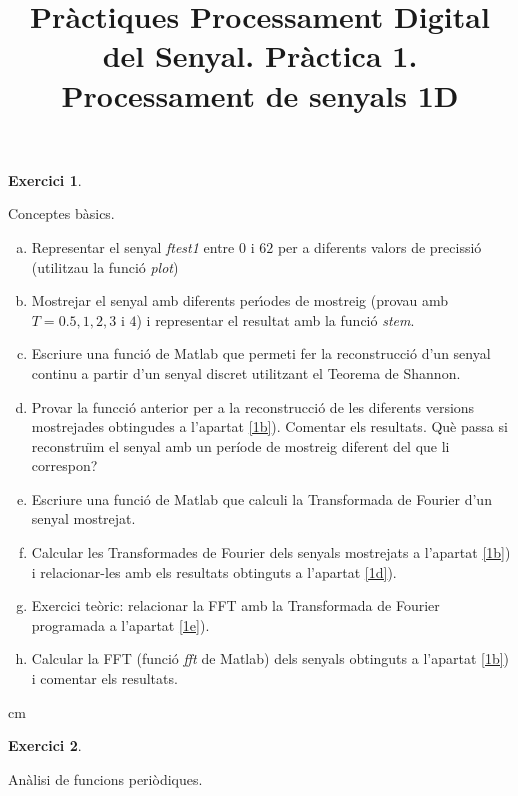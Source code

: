 \documentclass{article}
\title{Pr\`actiques Processament Digital del Senyal.
Pr\`actica 1. Processament de senyals 1D }
\date{}
\begin{document}
\maketitle

\noindent \textbf{Exercici 1}.\label{ex1}
\newline

Conceptes b\`asics.
\begin{enumerate}[a)]
\item \label{1a} Representar el senyal {\it ftest1} entre $0$ i
$62$ per a diferents valors de precissi\'o (utilitzau la funci\'o
{\it plot})

\item \label{1b} Mostrejar el senyal amb diferents per\'\i odes de
mostreig (provau amb $T=0.5, 1, 2, 3$ i $4$) i representar el
resultat amb la funci\'o {\it stem}.

\item \label{1c} Escriure una funci\'o de Matlab que permeti fer
la reconstrucci\'o d'un senyal continu a partir d'un senyal
discret utilitzant el Teorema de Shannon.

\item \label{1d} Provar la funcci\'o anterior per a la
reconstrucci\'o de les diferents versions mostrejades obtingudes a
l'apartat \ref{1b}). Comentar els resultats. Qu\`e passa si
reconstru\"\i m el senyal amb un per\'iode de mostreig diferent
del que li co\-rres\-pon?

\item \label{1e} Escriure una funci\'o de Matlab que calculi la
Transformada de Fourier d'un senyal mostrejat.

\item \label{1f} Calcular les Transformades de Fourier dels
senyals mostrejats a l'apartat \ref{1b}) i relacionar-les amb els
resultats obtinguts a l'apartat \ref{1d}).

\item \label{1g} Exercici te\`oric: relacionar la FFT amb la
Transformada de Fourier programada a l'apartat \ref{1e}).

\item \label{1h} Calcular la FFT (funci\'o {\it fft} de Matlab)
dels senyals obtinguts a l'apartat \ref{1b}) i comentar els
resultats.
\end{enumerate}

 cm

\noindent \textbf{Exercici 2}. \label{ex2}
\newline

An\`alisi de funcions peri\`odiques.
\newline
\end{document}

